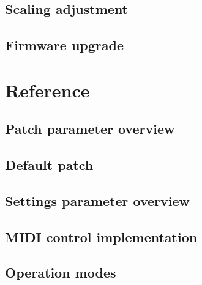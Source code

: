 \documentclass[landscape, 11pt, oneside, twoside]{report}
\newenvironment{flowtext}{\addmargin[0cm]{0cm}}{\endaddmargin} %
\begin{document}
\begin{flowtext}


\section{Scaling adjustment}\label{scalingadj}



\section{Firmware upgrade}\label{fwupgrade}

  

\end{flowtext}

\pagebreak
\chapter{Reference}

\begin{flowtext}

\section{Patch parameter overview}\label{patchref}



\pagebreak
\section{Default patch}\label{defaultpatch}



\pagebreak
\section{Settings parameter overview}\label{settingsref}



\pagebreak
\section{MIDI control implementation}\label{midiimplementation}



\end{flowtext}

\pagebreak

\section{Operation modes}\label{modes}
\end{document}
